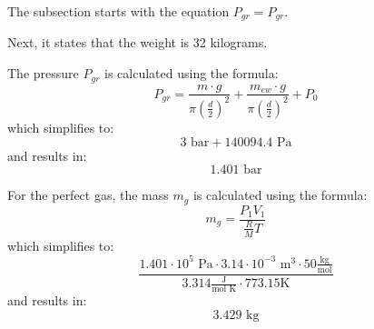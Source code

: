 The subsection starts with the equation \( P_{gr} = P_{gr} \).

Next, it states that the weight is 32 kilograms.

The pressure \( P_{gr} \) is calculated using the formula:
\[ P_{gr} = \frac{m \cdot g}{\pi \left(\frac{d}{2}\right)^2} + \frac{m_{ew} \cdot g}{\pi \left(\frac{d}{2}\right)^2} + P_0 \]
which simplifies to:
\[ 3 \text{ bar} + 140094.4 \text{ Pa} \]
and results in:
\[ 1.401 \text{ bar} \]

For the perfect gas, the mass \( m_g \) is calculated using the formula:
\[ m_g = \frac{P_1 V_1}{\frac{R}{M} T} \]
which simplifies to:
\[ \frac{1.401 \cdot 10^5 \text{ Pa} \cdot 3.14 \cdot 10^{-3} \text{ m}^3 \cdot 50 \frac{\text{kg}}{\text{mol}}}{3.314 \frac{\text{J}}{\text{mol K}} \cdot 773.15 \text{K}} \]
and results in:
\[ 3.429 \text{ kg} \]